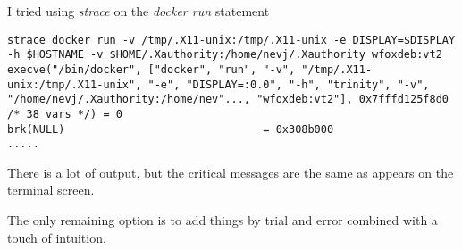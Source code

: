 \documentclass[a4paper]{article}  %
\begin{document}
I tried using {\em strace} on the {\em docker run} statement
\begin{tcolorbox}
\begin{verbatim}
strace docker run -v /tmp/.X11-unix:/tmp/.X11-unix -e DISPLAY=$DISPLAY -h $HOSTNAME -v $HOME/.Xauthority:/home/nevj/.Xauthority wfoxdeb:vt2
execve("/bin/docker", ["docker", "run", "-v", "/tmp/.X11-unix:/tmp/.X11-unix", "-e", "DISPLAY=:0.0", "-h", "trinity", "-v", "/home/nevj/.Xauthority:/home/nev"..., "wfoxdeb:vt2"], 0x7fffd125f8d0 /* 38 vars */) = 0
brk(NULL)                               = 0x308b000
.....
\end{verbatim}
\end{tcolorbox}
There is  a lot of output,  but the critical messages are the same as appears on the terminal screen.

The only remaining option is to add things by trial and error combined with a touch of intuition.
\end{document}
